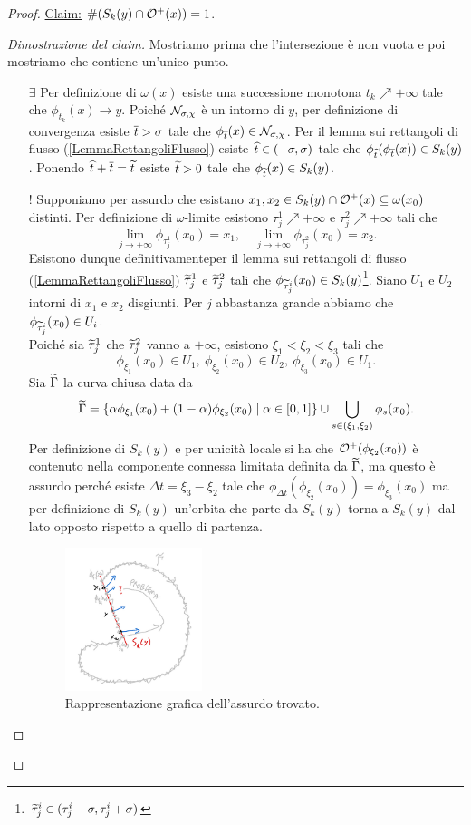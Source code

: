 \begin{proof}
\noindent
\ul{Claim:} $\#(S_k(y)\cap \mathcal{O}^+(x))=1$.
\begin{proof}[Dimostrazione del claim]
Mostriamo prima che l'intersezione \`e non vuota e poi mostriamo che contiene un'unico punto.
\setlength{\leftmargini}{0cm}
\begin{itemize}
\item[$\boxed{\exists}$] Per definizione di $\omega(x)$ esiste una successione monotona $t_k\nearrow +\infty$ tale che $\phi_{t_k}(x)\to y$. Poich\'e $\mathcal{N}_{\sigma,\chi}$ \`e un intorno di $y$, per definizione di convergenza esiste $\overline{t}>\sigma$ tale che $\phi_{\overline{t}}(x)\in \mathcal{N}_{\sigma,\chi}$. Per il lemma sui rettangoli di flusso (\ref{LemmaRettangoliFlusso}) esiste $\widehat{t}\in (-\sigma,\sigma)$ tale che $\phi_{\widehat{t}}(\phi_{\overline{t}}(x))\in S_k(y)$. Ponendo $\widehat{t}+\overline{t}=\widetilde{t}$ esiste $\widetilde{t}>0$ tale che $\phi_{\widetilde{t}}(x)\in S_k(y)$.
\item[$\boxed{!}$] Supponiamo per assurdo che esistano $x_1,x_2\in S_k(y)\cap \mathcal{O}^+(x)\subseteq \omega(x_0)$ distinti. Per definizione di $\omega$-limite esistono $\tau_{j}^1\nearrow+\infty$ e $\tau_{j}^2\nearrow+\infty$ tali che 
\[\lim_{j\to+\infty}\phi_{\tau^1_j}(x_0)=x_1,\quad \lim_{j\to+\infty}\phi_{\tau^2_j}(x_0)=x_2.\]
Esistono dunque definitivamenteper il lemma sui rettangoli di flusso (\ref{LemmaRettangoliFlusso}) $\widetilde{\tau}^1_j$ e $\widetilde{\tau}^2_j$ tali che $\phi_{\widetilde{\tau}^i_j}(x_0)\in S_k(y)$\footnote{$\widetilde{\tau}^i_j\in (\tau^i_j-\sigma,\tau^i_j+\sigma)$}. Siano $U_1$ e $U_2$ intorni di $x_1$ e $x_2$ disgiunti. Per $j$ abbastanza grande abbiamo che $\phi_{\widetilde{\tau}^i_j}(x_0)\in U_i$.\\
Poich\'e sia $\widetilde{\tau}_j^1$ che $\widetilde{\tau}_j^2$ vanno a $+\infty$, esistono $\xi_1<\xi_2<\xi_3$ tali che
\[\phi_{\xi_1}(x_0)\in U_1,\ \phi_{\xi_2}(x_0)\in U_2,\ \phi_{\xi_3}(x_0)\in U_1.\]
Sia $\widetilde{\Gamma}$ la curva chiusa data da
\[\widetilde{\Gamma}=\left\{{\alpha\phi_{\xi_1}(x_0)+(1-\alpha)\phi_{\xi_2}(x_0)\mid \alpha\in [0,1]}\right\}\cup \bigcup_{s\in (\xi_1,\xi_2)}\phi_s(x_0).\]
Per definizione di $S_k(y)$ e per unicit\`a locale si ha che $\mathcal{O}^+(\phi_{\xi_2}(x_0))$ \`e contenuto nella componente connessa limitata definita da $\widetilde{\Gamma}$, ma questo \`e assurdo perch\'e esiste $\Delta t=\xi_3-\xi_2$ tale che $\phi_{\Delta t}(\phi_{\xi_2}(x_0))=\phi_{\xi_3}(x_0)$ ma per definizione di $S_k(y)$ un'orbita che parte da $S_k(y)$ torna a $S_k(y)$ dal lato opposto rispetto a quello di partenza.
\begin{figure}[!htb]
    \centering
    \includegraphics[width=4cm]{Immagini/poincare_bendixon.png}
    \caption{Rappresentazione grafica dell'assurdo trovato.}
\end{figure}


\end{itemize}
\end{proof}
\end{proof}
